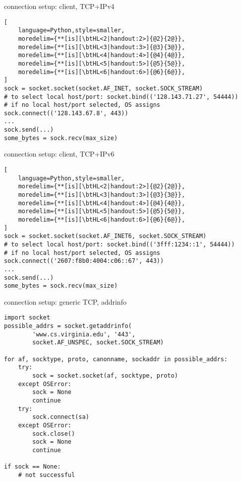 \begin{frame}[fragile,label=connSetupClientAddrInfo]{connection setup: client, TCP+IPv4}
\begin{lstlisting}[
    language=Python,style=smaller,
    moredelim={**[is][\btHL<2|handout:2>]{@2}{2@}},
    moredelim={**[is][\btHL<3|handout:3>]{@3}{3@}},
    moredelim={**[is][\btHL<4|handout:4>]{@4}{4@}},
    moredelim={**[is][\btHL<5|handout:5>]{@5}{5@}},
    moredelim={**[is][\btHL<6|handout:6>]{@6}{6@}},
]
sock = socket.socket(socket.AF_INET, socket.SOCK_STREAM)
# to select local host/port: socket.bind(('128.143.71.27', 54444))
# if no local host/port selected, OS assigns
sock.connect(('128.143.67.8', 443))
...
sock.send(...)
some_bytes = sock.recv(max_size)
\end{lstlisting}
\end{frame}

\begin{frame}[fragile,label=connSetupClientAddrInfo]{connection setup: client, TCP+IPv6}
\begin{lstlisting}[
    language=Python,style=smaller,
    moredelim={**[is][\btHL<2|handout:2>]{@2}{2@}},
    moredelim={**[is][\btHL<3|handout:3>]{@3}{3@}},
    moredelim={**[is][\btHL<4|handout:4>]{@4}{4@}},
    moredelim={**[is][\btHL<5|handout:5>]{@5}{5@}},
    moredelim={**[is][\btHL<6|handout:6>]{@6}{6@}},
]
sock = socket.socket(socket.AF_INET6, socket.SOCK_STREAM)
# to select local host/port: socket.bind(('3fff:1234::1', 54444))
# if no local host/port selected, OS assigns
sock.connect(('2607:f8b0:4004:c06::67', 443))
...
sock.send(...)
some_bytes = sock.recv(max_size)
\end{lstlisting}
\end{frame}


\begin{frame}[fragile,label=connSetupClientAddrInfo]{connection setup: generic TCP, addrinfo}
\begin{Verbatim}[fontsize=\fontsize{9}{10}]
import socket
possible_addrs = socket.getaddrinfo(
        'www.cs.virginia.edu', '443',
        socket.AF_UNSPEC, socket.SOCK_STREAM)

for af, socktype, proto, canonname, sockaddr in possible_addrs:
    try:
        sock = socket.socket(af, socktype, proto)
    except OSError:
        sock = None
        continue
    try:
        sock.connect(sa)
    except OSError:
        sock.close()
        sock = None
        continue

if sock == None:
    # not successful
\end{Verbatim}
\end{frame}

